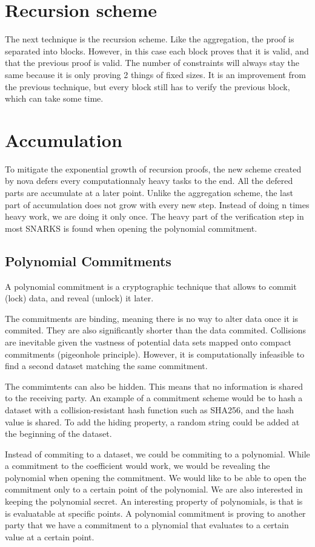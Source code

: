  \section{Recursion scheme} 
The next technique is the recursion scheme. Like the aggregation, the proof is separated into blocks. However, in this case each block proves that it is valid, and that the previous proof is valid. The number of constraints will always stay the same because it is only proving 2 things of fixed sizes. It is an improvement from the previous technique, but every block still has to verify the previous block, which can take some time.

\section{Accumulation}
To mitigate the exponential growth of recursion proofs, the new scheme created by nova defers every computationnaly heavy tasks to the end. 
All the defered parts are accumulate at a later point. Unlike the aggregation scheme, the last part of accumulation does not grow with every new step.
Instead of doing n times heavy work, we are doing it only once.
The heavy part of the verification step in most SNARKS is found when opening the polynomial commitment.

\subsection{Polynomial Commitments}

A polynomial commitment is a cryptographic technique that allows to commit (lock) data, and reveal (unlock) it later.

The commitments are binding, meaning there is no way to alter data once it is commited. They are also significantly shorter than
the data commited. Collisions are inevitable given the vastness of potential data sets mapped onto compact commitments (pigeonhole principle).
However, it is computationally infeasible to find a second dataset matching the same commitment.

The commimtents can also be hidden. This means that no information is shared to the receiving party. 
An example of a commitment scheme would be to hash a dataset with a collision-resistant hash function such as SHA256, and the hash value is shared.
To add the hiding property, a random string could be added at the beginning of the dataset.

Instead of commiting to a dataset, we could be commiting to a polynomial. While a commitment to the coefficient would work, we would be revealing the polynomial
when opening the commitment. We would like to be able to open the commitment only to a certain point of the polynomial. 
We are also interested in keeping the polynomial secret. An interesting property of polynomials, is that is is evaluatable at specific points.
A polynomial commitment is proving to another party that we have a commitment to a plynomial that evaluates to a certain value at a certain point.


